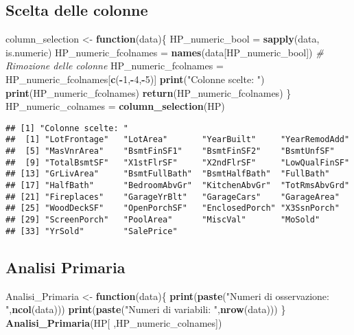 \documentclass[
]{article}
\newenvironment{Shaded}{\begin{snugshade}}{\end{snugshade}}
\newcommand{\CommentTok}[1]{\textcolor[rgb]{0.56,0.35,0.01}{\textit{#1}}}
\newcommand{\ControlFlowTok}[1]{\textcolor[rgb]{0.13,0.29,0.53}{\textbf{#1}}}
\newcommand{\DecValTok}[1]{\textcolor[rgb]{0.00,0.00,0.81}{#1}}
\newcommand{\FunctionTok}[1]{\textcolor[rgb]{0.13,0.29,0.53}{\textbf{#1}}}
\newcommand{\NormalTok}[1]{#1}
\newcommand{\OtherTok}[1]{\textcolor[rgb]{0.56,0.35,0.01}{#1}}
\newcommand{\SpecialCharTok}[1]{\textcolor[rgb]{0.81,0.36,0.00}{\textbf{#1}}}
\newcommand{\StringTok}[1]{\textcolor[rgb]{0.31,0.60,0.02}{#1}}
\begin{document}
\subsection{Scelta delle colonne}\label{scelta-delle-colonne}

\begin{Shaded}
\begin{Highlighting}[]
\NormalTok{column\_selection }\OtherTok{\textless{}{-}} \ControlFlowTok{function}\NormalTok{(data)\{}
\NormalTok{  HP\_numeric\_bool }\OtherTok{=} \FunctionTok{sapply}\NormalTok{(data, is.numeric)}
\NormalTok{  HP\_numeric\_fcolnames }\OtherTok{=} \FunctionTok{names}\NormalTok{(data[HP\_numeric\_bool])}
  \CommentTok{\# Rimozione delle colonne}
\NormalTok{  HP\_numeric\_fcolnames }\OtherTok{=}\NormalTok{ HP\_numeric\_fcolnames[}\FunctionTok{c}\NormalTok{(}\SpecialCharTok{{-}}\DecValTok{1}\NormalTok{,}\SpecialCharTok{{-}}\DecValTok{4}\NormalTok{,}\SpecialCharTok{{-}}\DecValTok{5}\NormalTok{)]}
  \FunctionTok{print}\NormalTok{(}\StringTok{"Colonne scelte: "}\NormalTok{)}
  \FunctionTok{print}\NormalTok{(HP\_numeric\_fcolnames)}
  \FunctionTok{return}\NormalTok{(HP\_numeric\_fcolnames)}
\NormalTok{\}}
\NormalTok{HP\_numeric\_colnames }\OtherTok{=} \FunctionTok{column\_selection}\NormalTok{(HP)}
\end{Highlighting}
\end{Shaded}

\begin{verbatim}
## [1] "Colonne scelte: "
##  [1] "LotFrontage"   "LotArea"       "YearBuilt"     "YearRemodAdd" 
##  [5] "MasVnrArea"    "BsmtFinSF1"    "BsmtFinSF2"    "BsmtUnfSF"    
##  [9] "TotalBsmtSF"   "X1stFlrSF"     "X2ndFlrSF"     "LowQualFinSF" 
## [13] "GrLivArea"     "BsmtFullBath"  "BsmtHalfBath"  "FullBath"     
## [17] "HalfBath"      "BedroomAbvGr"  "KitchenAbvGr"  "TotRmsAbvGrd" 
## [21] "Fireplaces"    "GarageYrBlt"   "GarageCars"    "GarageArea"   
## [25] "WoodDeckSF"    "OpenPorchSF"   "EnclosedPorch" "X3SsnPorch"   
## [29] "ScreenPorch"   "PoolArea"      "MiscVal"       "MoSold"       
## [33] "YrSold"        "SalePrice"
\end{verbatim}

\subsection{Analisi Primaria}\label{analisi-primaria}

\begin{Shaded}
\begin{Highlighting}[]
\NormalTok{Analisi\_Primaria }\OtherTok{\textless{}{-}} \ControlFlowTok{function}\NormalTok{(data)\{}
  \FunctionTok{print}\NormalTok{(}\FunctionTok{paste}\NormalTok{(}\StringTok{"Numeri di osservazione: "}\NormalTok{,}\FunctionTok{ncol}\NormalTok{(data)))}
  \FunctionTok{print}\NormalTok{(}\FunctionTok{paste}\NormalTok{(}\StringTok{"Numeri di variabili: "}\NormalTok{,}\FunctionTok{nrow}\NormalTok{(data)))}
\NormalTok{\}}
\FunctionTok{Analisi\_Primaria}\NormalTok{(HP[ ,HP\_numeric\_colnames])}
\end{Highlighting}
\end{Shaded}
\end{document}
